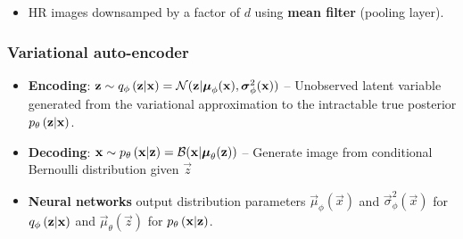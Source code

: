 \begin{itemize}
	\item HR images downsamped by a factor of $d$ using \textbf{mean filter} (pooling layer).
\end{itemize}

\subsubsection{Variational auto-encoder}
\label{ssub:vae}

\begin{itemize}
	\item \textbf{Encoding}: $\bm{\mathrm{z}} \sim q_{\phi}\left(\bm{\mathrm{z}}|\bm{\mathrm{x}}\right) = \mathcal{N}( \bm{\mathrm{z}}|\bm{\mathrm{\mu}}_\phi(\bm{\mathrm{x}}),\bm{\mathrm{\sigma}}^2_\phi(\bm{\mathrm{x}}))$ -- Unobserved latent variable generated from the variational approximation to the intractable true posterior $p_{\theta}\left(\bm{\mathrm{z}}|\bm{\mathrm{x}}\right)$.
	\item \textbf{Decoding}: $\bm{\mathrm{x}} \sim p_{\theta}\left(\bm{\mathrm{x}}|\bm{\mathrm{z}}\right)=\mathcal{B}( \bm{\mathrm{x}}|\bm{\mathrm{\mu}}_\theta(\bm{\mathrm{z}}))$ -- Generate image from conditional Bernoulli distribution given $\vec{z}$
	\item \textbf{Neural networks} output distribution parameters $\vec{\mu}_\phi(\vec{x})$ and $\vec{\sigma}^2_\phi(\vec{x})$ for $q_{\phi}\left(\bm{\mathrm{z}}|\bm{\mathrm{x}}\right)$ and $\vec{\mu}_\theta(\vec{z})$ for $p_{\theta}\left(\bm{\mathrm{x}}|\bm{\mathrm{z}}\right)$.

\end{itemize}
